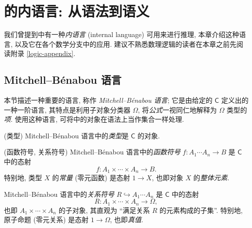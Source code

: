 \chapter{\topos{}的内语言: 从语法到语义}


我们曾提到\topos{}中有一种\emph{内语言} (internal language) 可用来进行推理, 本章介绍这种语言, 以及它在各个数学分支中的应用.
建议不熟悉数理逻辑的读者在本章之前先阅读附录 \ref{logic-appendix}.

\section{Mitchell--B\'enabou 语言}

\label{Mitchell--Benabou-language}

本节描述一种重要的语言, 称作 \emph{Mitchell--B\'enabou 语言}; 它是由给定的\topos{} $\mathsf C$ 定义出的一种一阶语言, 其特点是利用子对象分类器 $\Omega$, 将\emph{公式}一视同仁地解释为 $\Omega$ 类型的\emph{项}. 使用这种语言, 可将\topos{}中的对象在语法上当作集合一样处理.

\begin{definition}
    {(类型)}
    Mitchell--B\'enabou 语言中的\emph{类型}是 $\mathsf C$ 的对象.
\end{definition}




\begin{definition}
	{(函数符号, 关系符号)}
	Mitchell--B\'enabou 语言中的\emph{函数符号} $f\colon A_1\cdots A_n \to B$ 是 $\mathsf C$ 中的态射
	$$f\colon A_1\times\cdots\times A_n\to B.$$
	特别地, 类型 $X$ 的\emph{常量} (零元函数) 是态射 $1 \to X$, 也即对象 $X$ 的\emph{整体元素}.
	
	Mitchell--B\'enabou 语言中的\emph{关系符号} $R\hookrightarrow A_1\cdots A_n$ 是 $\mathsf C$ 中的态射
	$$
	R\colon A_1\times\cdots\times A_n \to \Omega,
	$$
	也即 $A_1\times\cdots\times A_n$ 的子对象, 其直观为 ``满足关系 $R$ 的元素构成的子集''.
	特别地, 原子命题 (零元关系) 是态射 $1\to\Omega$, 也即\emph{真值}.
	
\end{definition}

